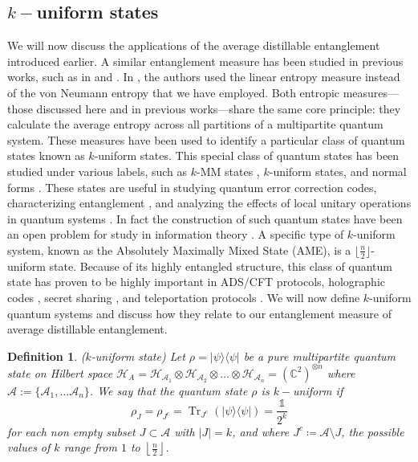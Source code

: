 \documentclass{article}
\newtheorem{definition}[theorem]{Definition}
\DeclareMathOperator{\Tr}{Tr}
\newcommand{\ketbra}[2]{| #1\rangle\! \langle #2|}
\newcommand{\identity}{\mathds{1}}
\begin{document}
\subsection{$k-$uniform states}
We will now discuss the applications of the average distillable entanglement introduced earlier. A similar entanglement measure has been studied in previous works, such as in \cite{Scott_k-uniform} and \cite{meyer2001global}. In \cite{Scott_k-uniform}, the authors used the linear entropy measure instead of the von Neumann entropy that we have employed. Both entropic measures—those discussed here and in previous works—share the same core principle: they calculate the average entropy across all partitions of a multipartite quantum system. These measures have been used to identify a particular class of quantum states known as $k$-uniform states. This special class of quantum states has been studied under various labels, such as $k$-MM states \cite{Cerf_k-MM}, $k$-uniform states, and normal forms \cite{MoorNormal_form}. These states are useful in studying quantum error correction codes\cite{Scott_k-uniform}, characterizing entanglement \cite{meyer2001global}, and analyzing the effects of local unitary operations in quantum systems \cite{Kraus_LU_Equivalence}. In fact the construction of such quantum states have been an open problem for study in information theory \cite{Karol_k-uniform_construction}. A specific type of $k$-uniform system, known as the Absolutely Maximally Mixed State (AME), is a $\lfloor \frac{n}{2} \rfloor$-uniform state. Because of its highly entangled structure, this class of quantum state has proven to be highly important in ADS/CFT protocols, holographic codes \cite{preskill_holographic_codes}, secret sharing \cite{Helwig_AME}, and teleportation protocols \cite{Helwig:2013ckb}. We will now define $k$-uniform quantum systems and discuss how they relate to our entanglement measure of average distillable entanglement.

\begin{definition}
\label{def:k-uniform}
($k$-uniform state)
    Let $\rho = \ketbra{\psi}{\psi}$ be a pure multipartite quantum state on Hilbert space $\mathcal{H}_A = \mathcal{H}_{\mathcal{A}_1} \otimes \mathcal{H}_{\mathcal{A}_2} \otimes \dots \otimes \mathcal{H}_{\mathcal{A}_n} = (\mathbb{C}^2)^{\otimes n}$  where $\mathcal{A} := \{\mathcal{A}_1, \ldots \mathcal{A}_n\}$. We say that the quantum state $\rho$ is $k-$uniform if 
    \begin{equation}
        \rho_J = \rho_{J^c} = \Tr_{J^c}(\ketbra{\psi}{\psi}) = \frac{\identity}{2^k}
    \end{equation}
for each non empty subset $ J \subset \mathcal{A} $ with $ |J| = k $, and where $ J^c \coloneqq \mathcal{A} \setminus J $, the possible values of $ k $ range from $ 1 $ to $ \left\lfloor \frac{n}{2} \right\rfloor $.
\end{definition} 
\end{document}
